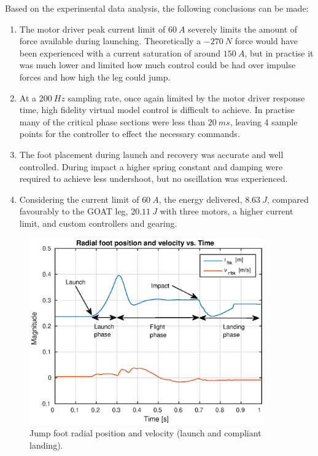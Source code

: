 Based on the experimental data analysis, the following conclusions can be made:
\begin{enumerate}
\item The motor driver peak current limit of $60\ A$ severely limits the amount of force available during launching. Theoretically a $-270\ N$ force would have been experienced with a current saturation of around $150\ A$, but in practise it was much lower and limited how much control could be had over impulse forces and how high the leg could jump.
\item At a $200\ Hz$ sampling rate, once again limited by the motor driver response time, high fidelity virtual model control is difficult to achieve. In practise many of the critical phase sections were less than $20\ ms$, leaving 4 sample points for the controller to effect the necessary commands.
\item The foot placement during launch and recovery was accurate and well controlled. During impact a higher spring constant and damping were required to achieve less undershoot, but no oscillation was experienced.
\item Considering the current limit of $60\ A$, the energy delivered, $8.63\ J$, compared favourably to the GOAT leg, $20.11\ J$ with three motors, a higher current limit, and custom controllers and gearing.
\end{enumerate}

\begin{figure}
\centering
\includegraphics[width=0.9\textwidth]{images/experiments/jump/jump-foot-position-velocity.eps} 
\caption{Jump foot radial position and velocity (launch and compliant landing).}
\label{fig:Jump foot radial position and velocity}
\end{figure}

